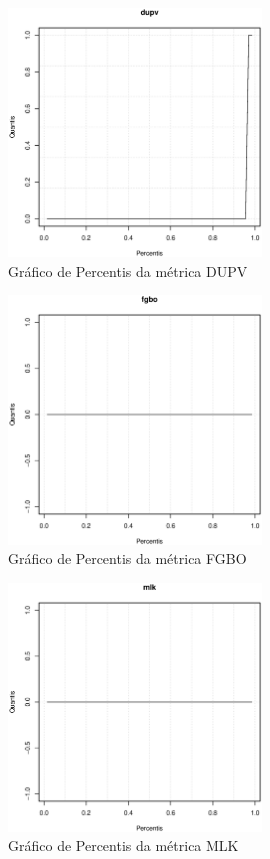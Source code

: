 \begin{apendicesenv}
\begin{figure}[h]
  \centering
  \includegraphics[width=0.6\textwidth]
      {dados/linux/dupv.eps}
  \caption{Gráfico de Percentis da métrica DUPV}
  \label{graphic:dupv}
\end{figure}

\newpage

\begin{figure}[h]
  \centering
  \includegraphics[width=0.6\textwidth]
      {dados/linux/fgbo.eps}
  \caption{Gráfico de Percentis da métrica FGBO}
\end{figure}

\begin{figure}[h]
  \centering
  \includegraphics[width=0.6\textwidth]
      {dados/linux/mlk.eps}
  \caption{Gráfico de Percentis da métrica MLK}
\end{figure}


\end{apendicesenv}
